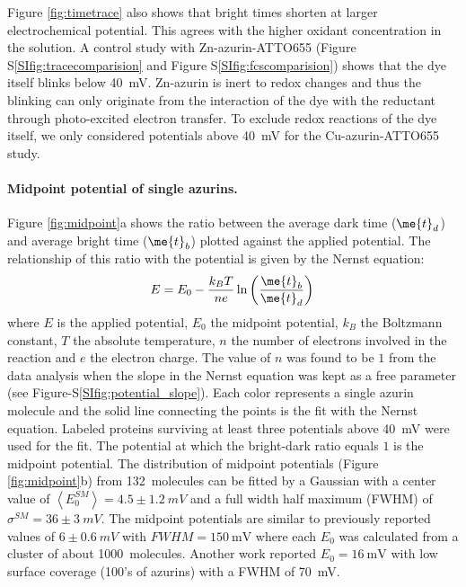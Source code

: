 Figure \ref{fig:timetrace} also shows that bright times shorten at larger electrochemical potential.
This agrees with the higher oxidant concentration in the solution. 
A control study with Zn-azurin-ATTO655 (Figure S\ref{SIfig:tracecomparision} and Figure S\ref{SIfig:fcscomparision}) shows that the dye itself blinks below \SI{40}{\mV}.
Zn-azurin is inert to redox changes and thus the blinking can only originate from the interaction of the dye with the reductant through photo-excited electron transfer.
To exclude redox reactions of the dye itself, we only considered potentials above \SI{40}{\mV} for the Cu-azurin-ATTO655 study.


\paragraph*{Midpoint potential of single azurins.}
Figure \ref{fig:midpoint}a shows the ratio between the average dark time ($\me{t}_{d}$) and average bright time ($\me{t}_{b}$) plotted against the applied potential.
The relationship of this ratio with the potential is given by the Nernst equation: 
\begin{equation}
	E = E_0 - \frac{k_BT}{n e}\ln\left(\frac{\me{t}_{b}}{\me{t}_{d}}\right)\,
	\label{eq:nernst}
\end{equation}
where $E$ is the applied potential, $E_0$ the midpoint potential, $k_B$ the Boltzmann constant, $T$ the absolute temperature, $n$ the number of electrons involved in the reaction and $e$ the electron charge.
The value of $n$ was found to be $1$ from the data analysis when the slope in the Nernst equation was kept as a free parameter (see Figure-S\ref{SIfig:potential_slope}).
Each color represents a single azurin molecule and the solid line connecting the points is the fit with the Nernst equation.
Labeled proteins surviving at least three potentials above \SI{40}{\mV} were used for the fit.
The potential at which the bright-dark  ratio equals $1$ is the midpoint potential.
The distribution of midpoint potentials (Figure \ref{fig:midpoint}b) from \SI{132}{ molecules} can be fitted by a Gaussian with a center value of $\left<E_0^{SM}\right>=4.5 \pm 1.2~mV$ and a full width half maximum (FWHM) of $\sigma^{SM}=36 \pm 3~mV$. 
The midpoint potentials are similar to previously reported values of $6\pm0.6~mV$ with $FWHM=\SI{150}{\mV}$ where each $E_0$ was calculated from a cluster of about \SI{1000}{ molecules}.\cite{davis2006monitoring}
Another work reported $E_0 = \SI{16}{\mV}$ with low surface coverage (100's of azurins) with a FWHM of \SI{70}{\mV}.\cite{salverda2010fluorescent} 
